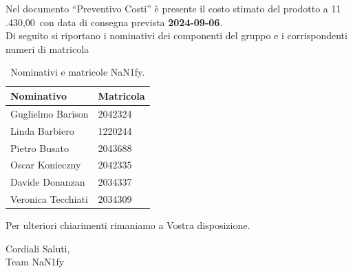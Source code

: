 \documentclass[8pt]{article}
\begin{document}
\vspace{1em}
Nel documento “Preventivo Costi” è presente il costo stimato del prodotto a 11 .430,00\;\texteuro\ con data di consegna prevista \textbf{2024-09-06}.\\
\vspace{1em}
Di seguito si riportano i nominativi dei componenti del gruppo e i corrispondenti numeri di matricola\\
\begin{table}[ht!]
	\centering
	\begin{tabular}{p{3cm} p{3cm}}
		\toprule
		\textbf{Nominativo} & \textbf{Matricola} \\
		\midrule
		Guglielmo Barison & 2042324 \\
		Linda Barbiero &  1220244 \\
		Pietro Busato & 2043688 \\
		Oscar Konieczny & 2042335 \\
		Davide Donanzan & 2034337 \\
		Veronica Tecchiati & 2034309 \\
		\bottomrule
	\end{tabular}
	\caption{Nominativi e matricole NaN1fy.}
	\label{table:Nominativi e matricole NaN1fy}
\end{table}
Per ulteriori chiarimenti rimaniamo a Vostra disposizione.
\vspace{1em}
\begin{flushleft}
	Cordiali Saluti,\\
	Team NaN1fy
\end{flushleft}
\clearpage
\newpage
\justifying
\end{document}
